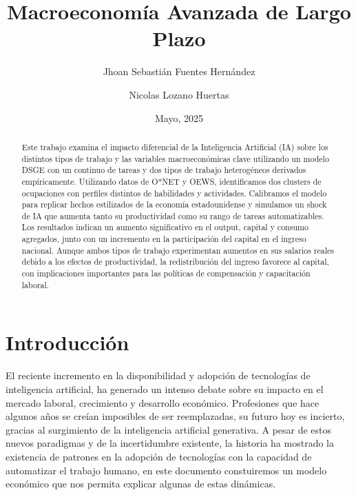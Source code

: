 \documentclass{article}
\title{\textbf{Macroeconom\'ia Avanzada de Largo Plazo}}
\author{Jhoan Sebasti\'an Fuentes Hern\'andez \and Nicolas Lozano Huertas}
\date{Mayo, 2025}
\theoremstyle{remark}
\theoremstyle{definition}
\begin{document}
\maketitle
\vspace{-1 cm}

\begin{abstract}
    Este trabajo examina el impacto diferencial de la Inteligencia Artificial (IA) sobre los distintos tipos de trabajo y las variables macroeconómicas clave utilizando un modelo DSGE con un continuo de tareas y dos tipos de trabajo heterogéneos derivados empíricamente. Utilizando datos de O*NET y OEWS, identificamos dos clusters de ocupaciones con perfiles distintos de habilidades y actividades. Calibramos el modelo para replicar hechos estilizados de la economía estadounidense y simulamos un shock de IA que aumenta tanto su productividad como su rango de tareas automatizables. Los resultados indican un aumento significativo en el output, capital y consumo agregados, junto con un incremento en la participación del capital en el ingreso nacional. Aunque ambos tipos de trabajo experimentan aumentos en sus salarios reales debido a los efectos de productividad, la redistribución del ingreso favorece al capital, con implicaciones importantes para las políticas de compensación y capacitación laboral.
\end{abstract}

\newpage
\section{Introducci\'on}


El reciente incremento en la disponibilidad y adopci\'on de tecnolog\'ias de inteligencia artificial, ha generado un intenso debate sobre su impacto en el mercado laboral, crecimiento y desarrollo econ\'omico. Profesiones que hace algunos años se creían imposibles de ser reemplazadas, su futuro hoy es incierto, gracias al surgimiento de la inteligencia artificial generativa. A pesar de estos nuevos paradigmas y de la incertidumbre existente, la historia ha mostrado la existencia de patrones en la adopci\'on de tecnologías con la capacidad de automatizar el trabajo humano, en este documento constuiremos un modelo econ\'omico que nos permita explicar algunas de estas din\'amicas.
\end{document}
